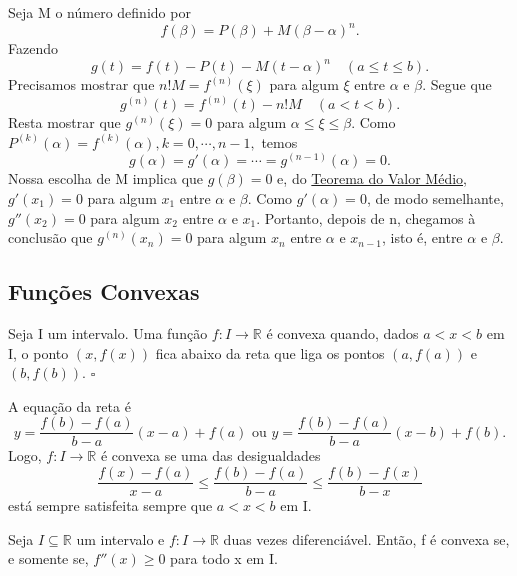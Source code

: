 \documentclass[Analysis/analysis_notes.tex]{subfiles}
\begin{document}
\begin{proof*}
	Seja M o número definido por
	\[
		f(\beta ) = P(\beta ) + M(\beta -\alpha )^{n}.
	\]
	Fazendo
	\[
		g(t) = f(t) - P(t) - M(t-\alpha )^{n}\quad (a\leq t\leq b).
	\]
	Precisamos mostrar que \(n!M = f^{(n)}(\xi)\) para algum \(\xi\) entre
	\(\alpha \) e \(\beta \). Segue que
	\[
		g^{(n)}(t) = f^{(n)}(t) - n!M\quad (a < t < b).
	\]
	Resta mostrar que \(g^{(n)}(\xi) = 0\) para algum \(\alpha \leq \xi\leq \beta .\)
	Como \(P^{(k)}(\alpha ) = f^{(k)}(\alpha ), k=0, \cdots, n-1,\) temos
	\[
		g(\alpha ) = g'(\alpha ) = \cdots = g^{(n-1)}(\alpha ) = 0.
	\]
	Nossa escolha de M implica que \(g(\beta ) = 0\) e, do \hyperlink{mean_value}{Teorema
		do Valor Médio,} \(g'(x_{1}) = 0\) para algum \(x_{1}\) entre \(\alpha \) e \(\beta \).
	Como \(g'(\alpha ) = 0\), de modo semelhante, \(g''(x_{2}) = 0\) para algum
	\(x_{2}\) entre \(\alpha \) e \(x_{1} \). Portanto, depois de n, chegamos à conclusão
	que \(g^{(n)}(x_{n}) = 0\) para algum \(x_{n}\) entre \(\alpha \) e \(x_{n-1}\), isto é,
	entre \(\alpha \) e \(\beta \). \qedsymbol
\end{proof*}
\subsection{Fun\c cões Convexas}
\begin{def*}
	Seja I um intervalo. Uma fun\c cão \(f:I\rightarrow \mathbb{R}\) é convexa quando,
	dados \(a < x < b\) em I, o ponto \((x, f(x))\) fica abaixo da reta que
	liga os pontos \((a, f(a))\) e \((b, f(b))\). \(\square\)
\end{def*}
A equa\c cão da reta é
\[
	y = \frac{f(b)-f(a)}{b-a}(x-a)+f(a) \text{ ou } y = \frac{f(b)-f(a)}{b-a}(x-b)+f(b).
\]
Logo, \(f:I\rightarrow \mathbb{R}\) é convexa se uma das desigualdades
\[
	\frac{f(x) - f(a)}{x-a}\leq \frac{f(b) - f(a)}{b-a}\leq \frac{f(b)-f(x)}{b-x}
\]
está sempre satisfeita sempre que \(a < x < b\) em I.
\hypertarget{convex_characterization}{ \begin{theorem*}
		Seja \(I\subseteq{\mathbb{R}}\) um intervalo e \(f:I\rightarrow \mathbb{R}\) duas vezes diferenciável.
		Então, f é convexa se, e somente se, \(f''(x)\geq 0\) para todo x em I.
	\end{theorem*}}
\end{document}

